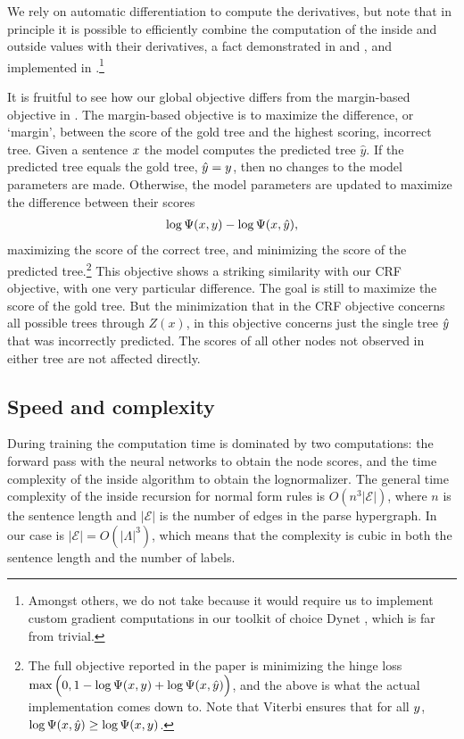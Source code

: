     We rely on automatic differentiation to compute the derivatives, but note that in principle it is possible to efficiently combine the computation of the inside and outside values with their derivatives, a fact demonstrated in \citep{eisner2009semirings} and \citep{eisner2016backprop}, and implemented in \citep{kim2017structured}.\footnote{Amongst others, we do not take because it would require us to implement custom gradient computations in our toolkit of choice Dynet \cite{neubig2017dynet}, which is far from trivial.}

    It is fruitful to see how our global objective differs from the margin-based objective in \citep{stern2017minimal}. The margin-based objective is to maximize the difference, or `margin', between the score of the gold tree and the highest scoring, incorrect tree. Given a sentence $x$ the model computes the predicted tree $\hat{y}$. If the predicted tree equals the gold tree, $\hat{y} = y$, then no changes to the model parameters are made. Otherwise, the model parameters are updated to maximize the difference between their scores
    \begin{align*}
      \log \Psi(x, y) - \log \Psi(x, \hat{y}),
    \end{align*}
    maximizing the score of the correct tree, and minimizing the score of the predicted tree.\footnote{The full objective reported in the paper is minimizing the hinge loss $\max \Big(0, 1 - \log \Psi(x, y) + \log \Psi(x, \hat{y}) \Big)$, and the above is what the actual implementation comes down to. Note that Viterbi ensures that for all $y$, $\log \Psi(x, \hat{y}) \geq \log \Psi(x, y)$.} This objective shows a striking similarity with our CRF objective, with one very particular difference. The goal is still to maximize the score of the gold tree. But the minimization that in the CRF objective concerns all possible trees through $Z(x)$, in this objective concerns just the single tree $\hat{y}$ that was incorrectly predicted. The scores of all other nodes not observed in either tree are not affected directly.

  \subsection{Speed and complexity}

    During training the computation time is dominated by two computations: the forward pass with the neural networks to obtain the node scores, and the time complexity of the inside algorithm to obtain the lognormalizer. The general time complexity of the inside recursion for normal form rules is $O(n^3 \lvert\mathcal{E}\rvert)$, where $n$ is the sentence length and $\lvert\mathcal{E}\rvert$ is the number of edges in the parse hypergraph. In our case is $\lvert\mathcal{E}\rvert = O(\lvert \Lambda \rvert^3)$, which means that the complexity is cubic in both the sentence length and the number of labels.

